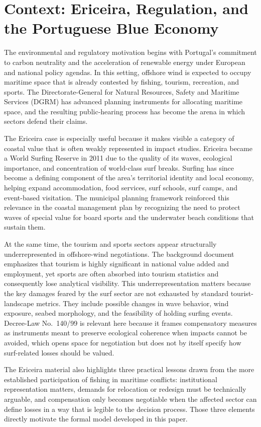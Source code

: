 \documentclass[final,times,authoryear]{elsarticle}
\begin{document}
\section{Context: Ericeira, Regulation, and the Portuguese Blue Economy}
\label{sec_context}

The environmental and regulatory motivation begins with Portugal's commitment to carbon neutrality and the acceleration of renewable energy under European and national policy agendas. In this setting, offshore wind is expected to occupy maritime space that is already contested by fishing, tourism, recreation, and sports. The Directorate-General for Natural Resources, Safety and Maritime Services (DGRM) has advanced planning instruments for allocating maritime space, and the resulting public-hearing process has become the arena in which sectors defend their claims.

The Ericeira case is especially useful because it makes visible a category of coastal value that is often weakly represented in impact studies. Ericeira became a World Surfing Reserve in 2011 due to the quality of its waves, ecological importance, and concentration of world-class surf breaks. Surfing has since become a defining component of the area's territorial identity and local economy, helping expand accommodation, food services, surf schools, surf camps, and event-based visitation. The municipal planning framework reinforced this relevance in the coastal management plan by recognizing the need to protect waves of special value for board sports and the underwater beach conditions that sustain them.

At the same time, the tourism and sports sectors appear structurally underrepresented in offshore-wind negotiations. The background document emphasizes that tourism is highly significant in national value added and employment, yet sports are often absorbed into tourism statistics and consequently lose analytical visibility. This underrepresentation matters because the key damages feared by the surf sector are not exhausted by standard tourist-landscape metrics. They include possible changes in wave behavior, wind exposure, seabed morphology, and the feasibility of holding surfing events. Decree-Law No.\ 140/99 is relevant here because it frames compensatory measures as instruments meant to preserve ecological coherence when impacts cannot be avoided, which opens space for negotiation but does not by itself specify how surf-related losses should be valued.

The Ericeira material also highlights three practical lessons drawn from the more established participation of fishing in maritime conflicts: institutional representation matters, demands for relocation or redesign must be technically arguable, and compensation only becomes negotiable when the affected sector can define losses in a way that is legible to the decision process. Those three elements directly motivate the formal model developed in this paper.
\end{document}

